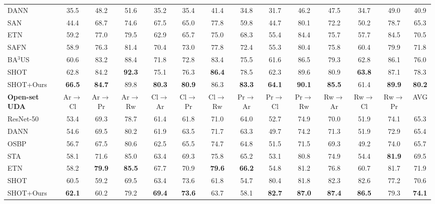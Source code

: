 \documentclass[10pt,twocolumn,letterpaper]{article}
\begin{document}
\begin{table*}
{{\begin{tabular}{lccccccccccccc}
        DANN~\cite{ganin2015DANN} & 35.5 & 48.2 & 51.6 & 35.2 & 35.4 & 41.4 & 34.8 & 31.7 & 46.2 & 47.5 & 34.7 & 49.0 & 40.9 \\
SAN~\cite{cao2018SAN} & 44.4 & 68.7 & 74.6 & 67.5 & 65.0 & 77.8 & 59.8 & 44.7 & 80.1 & 72.2 & 50.2 & 78.7 & 65.3 \\
        ETN~\cite{cao2019ETN} & 59.2 & 77.0 & 79.5 & 62.9 & 65.7 & 75.0 & 68.3 & 55.4 & 84.4 & 75.7 & 57.7 & 84.5 & 70.5 \\
        SAFN~\cite{xu2019SAFN} & 58.9 & 76.3 & 81.4 & 70.4 & 73.0 & 77.8 & 72.4 & 55.3 & 80.4 & 75.8 & 60.4 & 79.9 & 71.8 \\
        BA$^{3}$US~\cite{liang2020BA3US} & 60.6 & 83.2 & 88.4 & 71.8 & 72.8 & 83.4 & 75.5 & 61.6 & 86.5 & 79.3 & 62.8 & 86.1 & 76.0 \\
SHOT~\cite{liang2020shot} & 62.8 & 84.2 & \textbf{92.3} & 75.1 & 76.3 & \textbf{86.4} & 78.5 & 62.3 & 89.6 & 80.9 & \textbf{63.8} & 87.1 & 78.3 \\
SHOT+Ours & \textbf{66.5} & \textbf{84.7} & 89.8 & \textbf{80.3} & \textbf{80.9} & 86.3 & \textbf{83.3} & \textbf{64.1} & \textbf{90.1} & \textbf{85.5} & 61.4 & \textbf{89.9} & \textbf{80.2} \\
        \hline \hline
        \textbf{Open-set UDA} & Ar$\to$Cl & Ar$\to$Pr & Ar$\to$Rw & Cl$\to$Ar & Cl$\to$Pr & Cl$\to$Rw & Pr$\to$Ar & Pr$\to$Cl & Pr$\to$Rw & Rw$\to$Ar & Rw$\to$Cl & Rw$\to$Pr & AVG \\
\midrule
        ResNet-50~\cite{he2016resnet} & 53.4 & 69.3 & 78.7 & 61.4 & 61.8 & 71.0 & 64.0 & 52.7 & 74.9 & 70.0 & 51.9 & 74.1 & 65.3 \\
        DANN~\cite{ganin2015DANN}     & 54.6 & 69.5 & 80.2 & 61.9 & 63.5 & 71.7 & 63.3 & 49.7 & 74.2 & 71.3 & 51.9 & 72.9 & 65.4 \\
        OSBP~\cite{saito2018OSBP}     & 56.7 & 67.5 & 80.6 & 62.5 & 65.5 & 74.7 & 64.8 & 51.5 & 71.5 & 69.3 & 49.2 & 74.0 & 65.7 \\
        STA~\cite{liu2019STA} & 58.1 & 71.6 & 85.0 & 63.4 & 69.3 & 75.8 & 65.2 & 53.1 & 80.8 & 74.9 & 54.4 & \textbf{81.9} & 69.5 \\
        ETN~\cite{cao2019ETN} & 58.2 & \textbf{79.9} & \textbf{85.5} & 67.7 & 70.9 & \textbf{79.6} & \textbf{66.2} & 54.8 & 81.2 & 76.8 & 60.7 & 81.7 & 71.9 \\
SHOT~\cite{liang2020shot} & 60.5 & 59.2 & 69.5 & 63.4 & 73.6 & 61.8 & 54.7 & 80.4 & 81.8 & 82.3 & 82.6 & 77.2 & 70.6 \\
SHOT+Ours & \textbf{62.1} & 60.2 & 79.2 & \textbf{69.4} & \textbf{73.6} & 63.7 & 58.1 & \textbf{82.7} & \textbf{87.0} & \textbf{87.4} & \textbf{86.5} & 79.3 & \textbf{74.1} \\

\end{tabular}}}
\end{table*}
\end{document}
